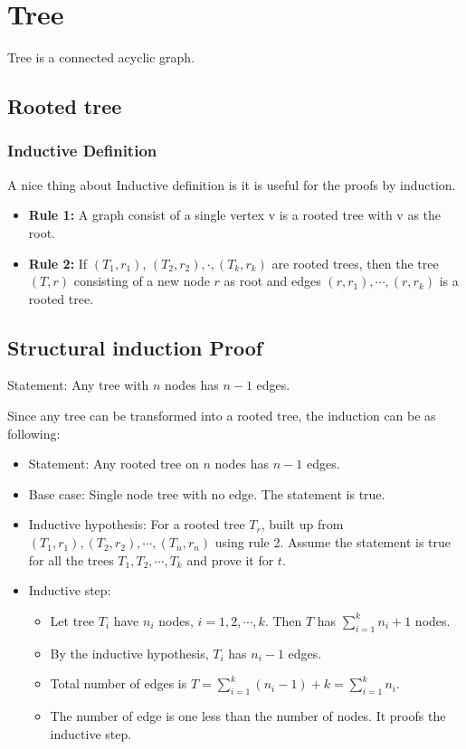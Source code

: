 \documentclass[en,hazy,blue,normal,12pt]{elegantnote}
\begin{document}
\section{Tree}
Tree is a connected acyclic graph.
\subsection{Rooted tree}
\subsubsection{Inductive Definition}
A nice thing about Inductive definition is it is useful for the proofs by 
induction.
\begin{itemize}
 \item \textbf{Rule 1:} A graph consist of a single vertex v is a rooted tree 
with v as the root.
 \item \textbf{Rule 2:} If $(T_1, r_1)$, $(T_2, r_2), \cdot, (T_k, r_k)$ are 
rooted trees, then the tree $(T, r)$ consisting of a new node $r$ as root and 
edges $(r, r_1), \cdots, (r, r_k)$ is a rooted tree.
\end{itemize}
\subsection{Structural induction Proof}
Statement: Any tree with $n$ nodes has $n-1$ edges.

Since any tree can be transformed into a rooted tree, the induction can be as 
following:
\begin{itemize}
 \item Statement: Any rooted tree on $n$ nodes has $n-1$ edges.
 \item Base case: Single node tree with no edge. The statement is true.
 \item Inductive hypothesis: For a rooted tree $T_r$, built up from $(T_1, 
r_1), (T_2, r_2), \cdots, (T_n, r_n)$ using rule 2. Assume the statement is 
true for all the trees $T_1, T_2, \cdots, T_k$ and prove it for $t$.
\item Inductive step:
    \begin{itemize}
    \item Let tree $T_i$ have $n_i$ nodes, $i = 1, 2, \cdots, k$. Then $T$ has 
    $\sum_{i=1}^k n_i + 1$ nodes.
    \item By the inductive hypothesis, $T_i$ has $n_i - 1$ edges.
    \item Total number of edges is $T = \sum_{i=1}^k (n_i - 1) + k = 
\sum_{i=1}^k 
    n_i$.
    \item The number of edge is one less than the number of nodes. It proofs 
the     inductive step.
    \end{itemize}
 \end{itemize}
\end{document}
